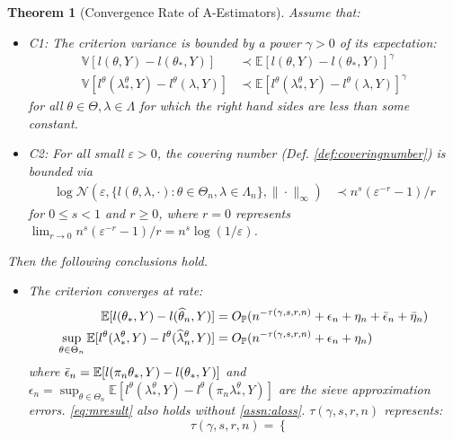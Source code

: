 \documentclass[12pt]{article}
\theoremstyle{myplain}
\newtheorem{theorem}{Theorem}[section]
\theoremstyle{definition}
\theoremstyle{definition}
\theoremstyle{remark}
\numberwithin{equation}{section}
\begin{document}
\begin{theorem}[Convergence Rate of A-Estimators]\label{thm:generalrate} Assume that:
\begin{itemize}[leftmargin=*]
    \item C1: The criterion variance is bounded by a power $\gamma > 0$ of its expectation:
    \begin{align}
        \mathbb{V}[l(\theta, Y)-l(\theta_*, Y)] & \prec \mathbb{E}[l(\theta, Y)-l(\theta_*, Y)]^{\gamma} \label{assn:aloss}\\
        \mathbb{V}[l^\theta(\lambda_*^\theta, Y)-l^\theta(\lambda, Y)] & \prec \mathbb{E}[l^\theta(\lambda_*^\theta, Y)-l^\theta(\lambda, Y)]^\gamma \label{assn:mloss}
    \end{align}
    for all $\theta\in\Theta,\lambda\in\Lambda$ for which the right hand sides are less than some constant.
    \item C2: For all small $\varepsilon>0$, the covering number (Def. \ref{def:coveringnumber}) is bounded via \begin{align}
        \log \mathcal{N}(\varepsilon, \{l(\theta, \lambda, \cdot): \theta\in\Theta_n, \lambda\in\Lambda_n\}, \|\cdot\|_\infty) & \prec n^{s}(\varepsilon^{-r}-1)/r \label{eq:covassn}
    \end{align}
    for $0\leq s<1$ and $r\geq 0$, where $r=0$ represents $\lim_{r\to0}n^{s}(\varepsilon^{-r}-1)/r=n^{s}\log(1/\varepsilon)$.
\end{itemize}
Then the following conclusions hold.
\begin{itemize}[leftmargin=*]
    \item[i)] The criterion converges at rate: \begin{align}
    \mathbb{E}[l(\theta_*, Y)-l(\widehat{\theta}_n, Y)] & =O_\mathbb{P}(n^{-\tau(\gamma, s, r, n)}  + \epsilon_n+\eta_n+ \Bar \epsilon_n+\Bar \eta_n) \label{eq:aresult} \\
    \sup_{\theta\in\Theta_n} \mathbb{E}[l^\theta(\lambda_*^\theta, Y)-l^\theta(\widehat{\lambda}_n^\theta, Y)] & =O_\mathbb{P}(n^{-\tau(\gamma, s, r, n)} + \epsilon_n+\eta_n) \label{eq:mresult}
\end{align}
where $\Bar\epsilon_n = \mathbb{E}[l(\pi_n\theta_*, Y)-l(\theta_*, Y)]$ and $\epsilon_n = \sup_{\theta\in\Theta_n} \mathbb{E}[l^\theta(\lambda_*^\theta, Y)-l^\theta(\pi_n \lambda_*^\theta, Y)]$ are the sieve approximation errors. \ref{eq:mresult} also holds without \ref{assn:aloss}. $\tau(\gamma, s, r, n)$ represents:
$$
\tau(\gamma, s, r, n)=\left\{\begin{array}{ll}

\end{array}$$
\end{itemize}
\end{theorem}
\end{document}
